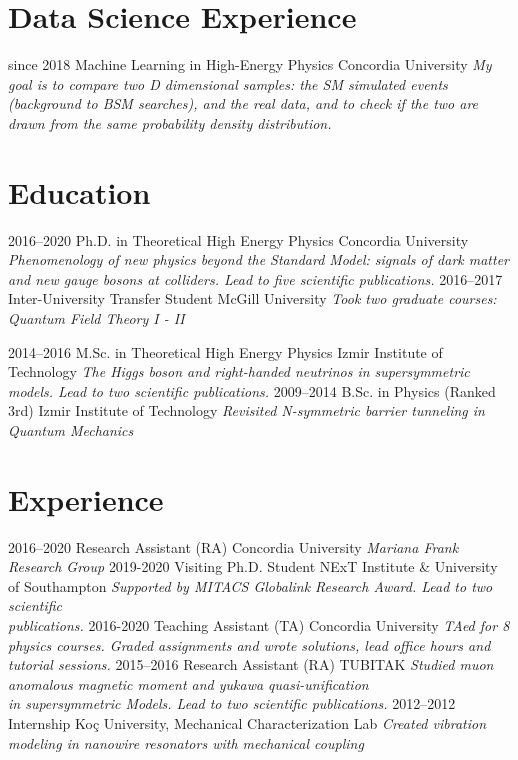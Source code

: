 \documentclass[]{friggeri-cv}
\begin{document}
\section{Data Science Experience}

\begin{entrylist}
	\entry
	{since 2018}
	{Machine Learning in High-Energy Physics}
	{Concordia University}
   {\emph{My goal is to compare two D dimensional samples: the SM simulated events (background to BSM searches), and the real data, and to check if the two are drawn from the same probability density distribution.}}

\end{entrylist}

\section{Education}
\begin{entrylist}
  \entry
    {2016--2020}
    {Ph.D. in Theoretical High Energy Physics}
    {Concordia University}
    {\emph{Phenomenology of new physics beyond the Standard Model: signals of dark matter and new gauge bosons at colliders. Lead to five scientific publications.}}
   \entry
   {2016--2017}
   {Inter-University Transfer Student}
   {McGill University}
   {\emph{Took two graduate courses: Quantum Field Theory I -  II}}
   
  \entry
    {2014–2016}
    {M.Sc. in Theoretical High Energy Physics}
    {Izmir Institute of Technology}
    {\emph{The Higgs boson and right-handed neutrinos in supersymmetric models. Lead to two scientific publications.}}
  \entry
    {2009–2014}
    {B.Sc. in Physics (Ranked 3rd)}
    {Izmir Institute of Technology}
    {\emph{Revisited N-symmetric barrier tunneling in Quantum Mechanics}}
    

\end{entrylist}

\section{Experience}

\begin{entrylist}
    \entry
	{2016--2020}
	{Research Assistant (RA)}
	{Concordia University}
	{\emph{Mariana Frank Research Group}}	
	 \entry
    {2019-2020}
    {Visiting Ph.D. Student}
    {NExT Institute \& University of Southampton}
    {\emph {Supported by MITACS Globalink Research Award. Lead to two scientific \\ publications.}}
    \entry
    {2016-2020}
    {Teaching Assistant (TA)}
    {Concordia University}
    {\emph{
    		TAed for 8 physics courses. Graded assignments and wrote solutions, lead office hours and tutorial sessions.
	}}
    \entry
    {2015--2016}
    {Research Assistant (RA)}
    {TUBITAK}
    {\emph{Studied muon anomalous magnetic moment and yukawa quasi-unification \\ in supersymmetric Models. Lead to two scientific publications.}}  
    \entry
  	{2012--2012}
  	{Internship}
  	{Koç University, Mechanical Characterization Lab}
  	{\emph{Created vibration modeling in nanowire resonators with mechanical coupling}}  
\end{entrylist}
\end{document}
